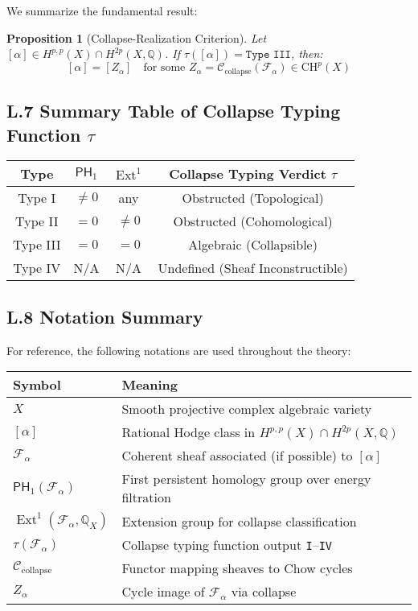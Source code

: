\documentclass[11pt]{article}
\newtheorem{proposition}[theorem]{Proposition}
\DeclareMathOperator{\Ext}{Ext}
\begin{document}
We summarize the fundamental result:

\begin{proposition}[Collapse-Realization Criterion]
Let $[\alpha] \in H^{p,p}(X) \cap H^{2p}(X, \mathbb{Q})$.  
If $\tau([\alpha]) = \texttt{Type III}$, then:
\[
[\alpha] = [Z_\alpha] \quad \text{for some } Z_\alpha = \mathcal{C}_{\text{collapse}}(\mathcal{F}_\alpha) \in \mathrm{CH}^p(X)
\]
\end{proposition}

\subsection*{L.7 Summary Table of Collapse Typing Function $\tau$}

\begin{center}
\renewcommand{\arraystretch}{1.4}
\begin{tabular}{|c|c|c|c|}
\hline
\textbf{Type} & $\mathsf{PH}_1$ & $\Ext^1$ & Collapse Typing Verdict $\tau$ \\
\hline
Type I & $\ne 0$ & any & Obstructed (Topological) \\
Type II & $= 0$ & $\ne 0$ & Obstructed (Cohomological) \\
Type III & $= 0$ & $= 0$ & Algebraic (Collapsible) \\
Type IV & N/A & N/A & Undefined (Sheaf Inconstructible) \\
\hline
\end{tabular}
\end{center}

\subsection*{L.8 Notation Summary}

For reference, the following notations are used throughout the theory:

\begin{longtable}{|p{3cm}|p{11.5cm}|}
\hline
\textbf{Symbol} & \textbf{Meaning} \\
\hline \hline
$X$ & Smooth projective complex algebraic variety \\
\hline
$[\alpha]$ & Rational Hodge class in $H^{p,p}(X) \cap H^{2p}(X, \mathbb{Q})$ \\
\hline
$\mathcal{F}_\alpha$ & Coherent sheaf associated (if possible) to $[\alpha]$ \\
\hline
$\mathsf{PH}_1(\mathcal{F}_\alpha)$ & First persistent homology group over energy filtration \\
\hline
$\Ext^1(\mathcal{F}_\alpha, \mathbb{Q}_X)$ & Extension group for collapse classification \\
\hline
$\tau(\mathcal{F}_\alpha)$ & Collapse typing function output \texttt{I}–\texttt{IV} \\
\hline
$\mathcal{C}_{\text{collapse}}$ & Functor mapping sheaves to Chow cycles \\
\hline
$Z_\alpha$ & Cycle image of $\mathcal{F}_\alpha$ via collapse \\
\hline
\end{longtable}
\end{document}
